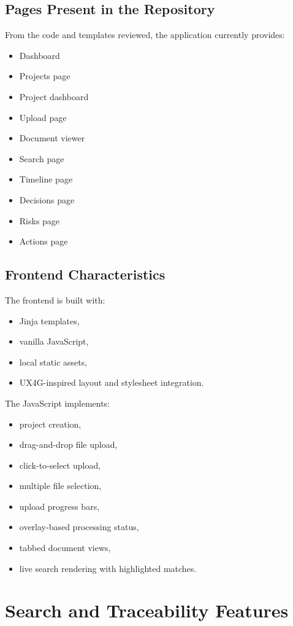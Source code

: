 \documentclass[12pt, a4paper]{article}
\begin{document}
\subsection{Pages Present in the Repository}
From the code and templates reviewed, the application currently provides:
\begin{itemize}
\item Dashboard
\item Projects page
\item Project dashboard
\item Upload page
\item Document viewer
\item Search page
\item Timeline page
\item Decisions page
\item Risks page
\item Actions page
\end{itemize}

\subsection{Frontend Characteristics}
The frontend is built with:
\begin{itemize}
\item Jinja templates,
\item vanilla JavaScript,
\item local static assets,
\item UX4G-inspired layout and stylesheet integration.
\end{itemize}

The JavaScript implements:
\begin{itemize}
\item project creation,
\item drag-and-drop file upload,
\item click-to-select upload,
\item multiple file selection,
\item upload progress bars,
\item overlay-based processing status,
\item tabbed document views,
\item live search rendering with highlighted matches.
\end{itemize}

\section{Search and Traceability Features}
\end{document}

